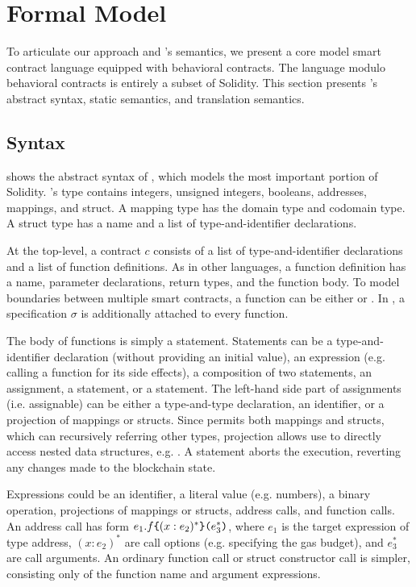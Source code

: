 \section{Formal Model} \label{sec:model}

To articulate our approach and \lang's semantics, we present a core model
smart contract language \corelang equipped with
behavioral contracts. The language modulo behavioral
contracts is entirely a subset of Solidity.
This section presents \corelang's abstract syntax, static semantics, and
translation semantics.



\subsection{Syntax}

 shows the abstract syntax of \corelang,
which models the most important portion of Solidity.
\corelang's type contains integers, unsigned integers, booleans,
addresses, mappings, and struct.
A mapping type has the domain type and codomain type.
A struct type has a name and a list of type-and-identifier declarations.

At the top-level, a contract $c$ consists of a list of type-and-identifier
declarations and a list of function definitions.  As in other languages, a
function definition has a name, parameter declarations, return types, and the
function body.  To model boundaries between multiple smart contracts, a
function can be either  or .
In \corelang, a specification $\sigma$ is additionally attached to every function.

The body of functions is simply a statement.
Statements can be a type-and-identifier declaration (without providing an initial
value), an expression (e.g. calling a function for its side effects), a
composition of two statements, an assignment, a  statement, or a  statement.
The left-hand side part of assignments (i.e. assignable) can be either
a type-and-type declaration, an identifier, or a projection of mappings or structs.
Since \corelang permits both mappings and structs, which can recursively referring
other types, projection allows use to directly access nested data structures,
e.g. .
A  statement aborts the execution, reverting any changes made to
the blockchain state.

Expressions could be an identifier, a literal value (e.g. numbers), a binary
operation, projections of mappings or structs, address calls, and function calls.
An address call has form $e_1.f\texttt{\{}(x: e_2)^*\texttt{\}(}e_3^*\texttt{)}$,
where $e_1$ is the target expression of type address,
$(x: e_2)^*$ are call options (e.g. specifying the gas budget),
and $e_3^*$ are call arguments.
An ordinary function call or struct constructor call is simpler, consisting
only of the function name and argument expressions.

